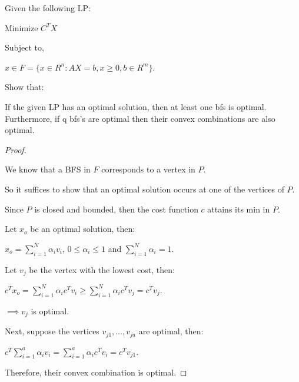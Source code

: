 \documentclass{article}
\begin{document}
\newpage

\begin{customthm}{2}
  $ $

  Given the following LP: 
  
  \qquad Minimize $C^TX$ 
  
  Subject to, 
  
  \qquad $x \in F = \{x \in R^n: AX=b, x\geq 0, b\in R^m \}$.
  \newline

  Show that:

  \qquad If the given LP has an optimal solution, then at least one bfs is optimal. Furthermore, if q bfs's are optimal then their convex combinations are also optimal.
  
\end{customthm}

\begin{proof}
  $ $
  
  We know that a BFS in $F$ corresponds to a vertex in $P$.

  So it suffices to show that an optimal solution occurs at one of the vertices of $P$.
  \newline

  Since $P$ is closed and bounded, then the cost function $c$ attains its min in $P$.

  Let $x_o$ be an optimal solution, then:

  \qquad $x_o = \sum_{i=1}^{N}\alpha_i v_i$, \quad $0 \leq \alpha_i \leq 1$ and $\sum_{i=1}^{N}\alpha_i = 1$.
  \newline
  
  Let $v_j$ be the vertex with the lowest cost, then:

  \qquad $c^T x_o =  \sum_{i=1}^{N}\alpha_i c^T v_i \geq \sum_{i=1}^{N}\alpha_i c^T v_j = c^T v_j$.

  \noindent
  $\implies v_j$ is optimal.
  \newline

  Next, suppose the vertices $v_{j1}, \ldots, v_{ja}$ are optimal, then:

  \qquad $c^T \sum_{i=1}^{a}\alpha_i v_i = \sum_{i=1}^{a}\alpha_i c^T v_i = c^T v_{j1}$.
  \newline

  Therefore, their convex combination is optimal.

  

\end{proof}

\newpage
\end{document}
